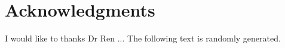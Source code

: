 \newpage
\chapter*{Acknowledgments}
 I would like to thanks Dr Ren ... The following text is randomly generated. \lipsum[3]